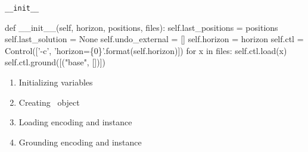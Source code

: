 \begin{frame}[fragile]{\texttt{\_\_init\_\_}}
\scriptsize
\begin{semiverbatim}
    def \alert<1>{__init__}(self, horizon, positions, files):
      \alert<2>{self.last_positions = positions}
      \alert<2>{self.last_solution = None}
      \alert<2>{self.undo_external = []}
      \alert<2>{self.horizon = horizon}
      \alert<3>{self.ctl = \alert<6>{Control}(['-c', 'horizon=\{0\}'.format(self.horizon)])}
\only<4>{>>}\only<-3,5->{  }      \alert<4>{for x in files:}
          \alert<4>{self.ctl.\alert<6>{load}(x)}
      \alert<5>{self.ctl.\alert<6>{ground}([("base", [])])}
\end{semiverbatim}
\normalsize
\begin{enumerate}
\item<2-> Initializing variables
\item<3-> Creating \clingo\ object
\item<4-> Loading encoding and instance
\item<5-> Grounding encoding and instance
\end{enumerate}
\end{frame}
